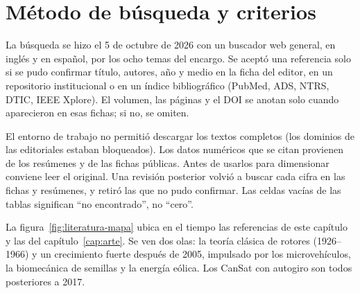 \section{Método de búsqueda y criterios}\label{sec:literatura-metodo}
La búsqueda se hizo el 5 de octubre de 2026 con un buscador web general, en inglés y en
español, por los ocho temas del encargo. Se aceptó una referencia solo si se pudo
confirmar título, autores, año y medio en la ficha del editor, en un repositorio
institucional o en un índice bibliográfico (PubMed, ADS, NTRS, DTIC, IEEE Xplore). El
volumen, las páginas y el DOI se anotan solo cuando aparecieron en esas fichas; si no, se
omiten.

\begin{nota}
El entorno de trabajo no permitió descargar los textos completos (los dominios de las
editoriales estaban bloqueados). Los datos numéricos que se citan provienen de los
resúmenes y de las fichas públicas. Antes de usarlos para dimensionar conviene leer el
original. Una revisión posterior volvió a buscar cada cifra en las fichas y resúmenes, y
retiró las que no pudo confirmar. Las celdas vacías de las tablas significan ``no
encontrado'', no ``cero''.
\end{nota}

La figura~\ref{fig:literatura-mapa} ubica en el tiempo las referencias de este capítulo y
las del capítulo~\ref{cap:arte}. Se ven dos olas: la teoría clásica de rotores
(1926--1966) y un crecimiento fuerte después de 2005, impulsado por los microvehículos,
la biomecánica de semillas y la energía eólica. Los CanSat con autogiro son todos
posteriores a 2017.

